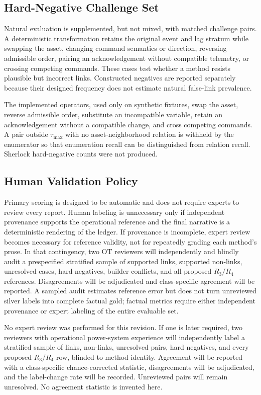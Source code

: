 \documentclass[conference]{IEEEtran}
\begin{document}
\subsection{Hard-Negative Challenge Set}

Natural evaluation is supplemented, but not mixed, with matched challenge pairs. A deterministic transformation retains the original event and lag stratum while swapping the asset, changing command semantics or direction, reversing admissible order, pairing an acknowledgement without compatible telemetry, or crossing competing commands. These cases test whether a method resists plausible but incorrect links. Constructed negatives are reported separately because their designed frequency does not estimate natural false-link prevalence.

The implemented operators, used only on synthetic fixtures, swap the asset, reverse admissible order, substitute an incompatible variable, retain an acknowledgement without a compatible change, and cross competing commands. A pair outside $\tau_{\max}$ with no asset-neighborhood relation is withheld by the enumerator so that enumeration recall can be distinguished from relation recall. Sherlock hard-negative counts were not produced.

\subsection{Human Validation Policy}

Primary scoring is designed to be automatic and does not require experts to review every report. Human labeling is unnecessary only if independent provenance supports the operational reference and the final narrative is a deterministic rendering of the ledger. If provenance is incomplete, expert review becomes necessary for reference validity, not for repeatedly grading each method's prose. In that contingency, two OT reviewers will independently and blindly audit a prespecified stratified sample of supported links, supported non-links, unresolved cases, hard negatives, builder conflicts, and all proposed $R_3/R_4$ references. Disagreements will be adjudicated and class-specific agreement will be reported. A sampled audit estimates reference error but does not turn unreviewed silver labels into complete factual gold; factual metrics require either independent provenance or expert labeling of the entire evaluable set.

No expert review was performed for this revision. If one is later required, two reviewers with operational power-system experience will independently label a stratified sample of links, non-links, unresolved pairs, hard negatives, and every proposed $R_3$/$R_4$ row, blinded to method identity. Agreement will be reported with a class-specific chance-corrected statistic, disagreements will be adjudicated, and the label-change rate will be recorded. Unreviewed pairs will remain unresolved. No agreement statistic is invented here.
\end{document}
